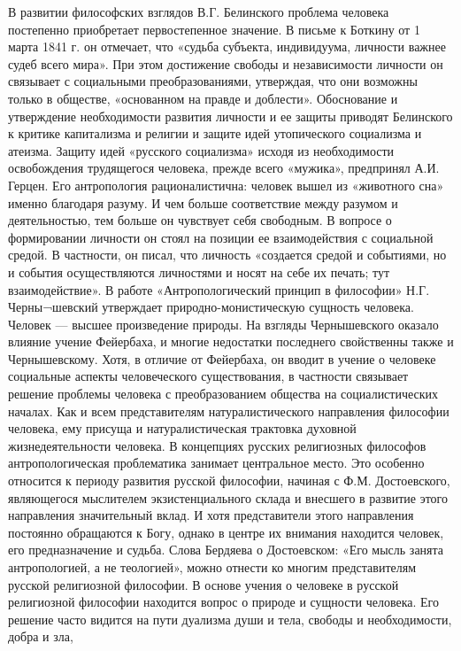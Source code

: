 \documentclass[12pt]{article}
\begin{document}
В развитии философских взглядов В.Г. Белинского проблема человека постепенно приобретает первостепенное
значение. В письме к Боткину от 1 марта 1841 г. он отмечает, что «судьба субъекта, индивидуума, личности 
важнее судеб всего мира». При этом достижение свободы и независимости личности он связывает с
социальными преобразованиями, утверждая, что они возможны только в обществе, «основанном на правде и
доблести». Обоснование и утверждение необходимости развития личности и ее защиты приводят Белинского к
критике капитализма и религии и защите идей утопического социализма и атеизма.
Защиту идей «русского социализма» исходя из необходимости освобождения трудящегося человека, прежде
всего «мужика», предпринял А.И. Герцен. Его антропология рационалистична: человек вышел из «животного
сна» именно благодаря разуму. И чем больше соответствие между разумом и деятельностью, тем больше он
чувствует себя свободным. В вопросе о формировании личности он стоял на позиции ее взаимодействия с
социальной средой. В частности, он писал, что личность «создается средой и событиями, но и события
осуществляются личностями и носят на себе их печать; тут взаимодействие».
В работе «Антропологический принцип в философии» Н.Г. Черны¬шевский утверждает природно-монистическую сущность человека. Человек — высшее произведение природы. На взгляды Чернышевского
оказало влияние учение Фейербаха, и многие недостатки последнего свойственны также и Чернышевскому.
Хотя, в отличие от Фейербаха, он вводит в учение о человеке социальные аспекты человеческого
существования, в частности связывает решение проблемы человека с преобразованием общества на
социалистических началах. Как и всем представителям натуралистического направления философии человека,
ему присуща и натуралистическая трактовка духовной жизнедеятельности человека.
В концепциях русских религиозных философов антропологическая проблематика занимает центральное место.
Это особенно относится к периоду развития русской философии, начиная с Ф.М. Достоевского, являющегося
мыслителем экзистенциального склада и внесшего в развитие этого направления значительный вклад. И хотя
представители этого направления постоянно обращаются к Богу, однако в центре их внимания находится
человек, его предназначение и судьба. Слова Бердяева о Достоевском: «Его мысль занята антропологией, а не
теологией», можно отнести ко многим представителям русской религиозной философии.
В основе учения о человеке в русской религиозной философии находится вопрос о природе и сущности
человека. Его решение часто видится на пути дуализма души и тела, свободы и необходимости, добра и зла,
\end{document}
